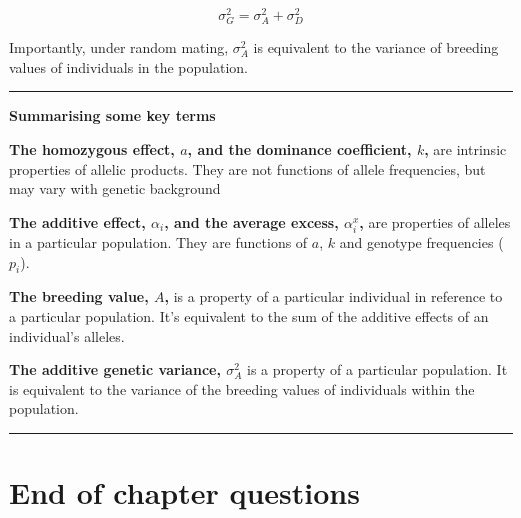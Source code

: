 \documentclass[
]{book}
\begin{document}
\[ \sigma^2_G = \sigma^2_A + \sigma^2_D \]

Importantly, under random mating, \(\sigma^2_A\) is equivalent to the variance of breeding values of individuals in the population.

\begin{center}\rule{0.5\linewidth}{0.5pt}\end{center}

\textbf{Summarising some key terms}

\textbf{The homozygous effect, \(a\), and the dominance coefficient, \(k\),} are intrinsic properties of allelic products. They are not functions of allele frequencies, but may vary with genetic background

\textbf{The additive effect, \(\alpha_i\), and the average excess, \(\alpha^x_i\),} are properties of alleles in a particular population. They are functions of \(a\), \(k\) and genotype frequencies (\(p_i\)).

\textbf{The breeding value, \(A\),} is a property of a particular individual in reference to a particular population. It's equivalent to the sum of the additive effects of an individual's alleles.

\textbf{The additive genetic variance, \(\sigma^2_A\)} is a property of a particular population. It is equivalent to the variance of the breeding values of individuals within the population.

\begin{center}\rule{0.5\linewidth}{0.5pt}\end{center}

\hypertarget{end-of-chapter-questions-1}{%
\section{End of chapter questions}\label{end-of-chapter-questions-1}}
\end{document}
